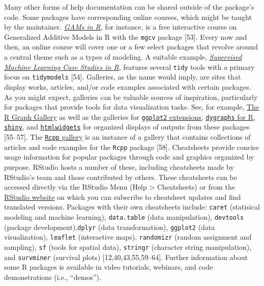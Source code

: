 \documentclass[10pt,letterpaper]{article}
\begin{document}
Many other forms of help documentation can be shared outside of the
package's code. Some packages have corresponding online courses, which
might be taught by the maintainer.
\href{https://noamross.github.io/gams-in-r-course/}{\emph{GAMs in R}},
for instance, is a free interactive course on Generalized Additive
Models in R with the \texttt{mgcv} package {[}53{]}. Every now and then,
an online course will cover one or a few select packages that revolve
around a central theme such as a types of modeling. A suitable example,
\href{https://supervised-ml-course.netlify.app/}{\emph{Supervised
Machine Learning Case Studies in R}}, features several \texttt{tidy}
tools with a primary focus on \texttt{tidymodels} {[}54{]}. Galleries,
as the name would imply, are sites that display works, articles, and/or
code examples associated with certain packages. As you might expect,
galleries can be valuable sources of inspiration, particularly for
packages that provide tools for data visualization tasks. See, for
example, \href{https://www.r-graph-gallery.com/}{The R Graph Gallery} as
well as the galleries for
\href{https://exts.ggplot2.tidyverse.org/gallery/}{\texttt{ggplot2}
extensions},
\href{https://rstudio.github.io/dygraphs/index.html}{\texttt{dygraphs}
for R}, \href{https://shiny.rstudio.com/gallery/}{\texttt{shiny}}, and
\href{https://gallery.htmlwidgets.org/}{\texttt{htmlwidgets}} for
organized displays of outputs from these packages {[}55--57{]}. The
\href{https://gallery.rcpp.org/}{\texttt{Rcpp} gallery} is an instance
of a gallery that contains collections of articles and code examples for
the \texttt{Rcpp} package {[}58{]}. Cheatsheets provide concise usage
information for popular packages through code and graphics organized by
purpose. RStudio hosts a number of these, including cheatsheets made by
RStudio's team and those contributed by others. These cheatsheets can be
accessed directly via the RStudio Menu (Help \textgreater{} Cheatsheets)
or from the \href{https://rstudio.com/resources/cheatsheets/}{RStudio
website} on which you can subscribe to cheatsheet updates and find
translated versions. Packages with their own cheatsheets include:
\texttt{caret} (statisical modeling and machine learning),
\texttt{data.table} (data manipulation), \texttt{devtools} (package
development),\texttt{dplyr} (data transformation), \texttt{ggplot2}
(data visualization), \texttt{leaflet} (interactive maps),
\texttt{randomizr} (random assignment and sampling), \texttt{sf} (tools
for spatial data), \texttt{stringr} (character string manipulation), and
\texttt{survminer} (survival plots) {[}12,40,43,55,59--64{]}. Further
information about some R packages is available in video tutorials,
webinars, and code demonstrations (i.e., ``demos'').
\end{document}
